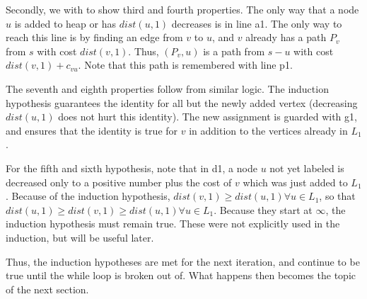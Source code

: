 \documentclass{article}
\begin{document}
Secondly, we with to show third and fourth properties.
The only way that a node $u$ is added to heap or has $dist(u,1)$ decreases is in line a1.
The only way to reach this line is by finding an edge from $v$ to $u$, and $v$ already has a path $P_v$ from $s$ with cost $dist(v,1)$.
Thus, $(P_v, u)$ is a path from $s-u$ with cost $dist(v,1) + c_{vu}$.
Note that this path is remembered with line p1.

The seventh and eighth properties follow from similar logic.
The induction hypothesis guarantees the identity for all but the newly added vertex (decreasing $dist(u,1)$ does not hurt this identity).
The new assignment is guarded with g1, and ensures that the identity is true for $v$ in addition to the vertices already in $L_1$.


For the fifth and sixth hypothesis, note that in d1, a node $u$ not yet labeled is decreased only to a positive number plus the cost of $v$ which was just added to $L_1$.
Because of the induction hypothesis, $dist(v,1) \ge dist(u,1) \forall u \in L_1$, so that $dist(u,1) \ge dist(v,1) \ge dist(u,1) \forall u \in L_1$.
Because they start at $\infty$, the induction hypothesis must remain true.
These were not explicitly used in the induction, but will be useful later.

Thus, the induction hypotheses are met for the next iteration, and continue to be true until the while loop is broken out of.
What happens then becomes the topic of the next section.
\end{document}
